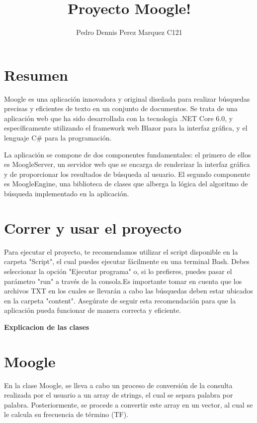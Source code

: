 \documentclass{article}
\begin{document}
\title{\textbf{Proyecto Moogle!}}
\author{Pedro Dennis Perez Marquez C121}
\date{}

\maketitle

\section* {Resumen}
Moogle es una aplicación innovadora y original diseñada para realizar búsquedas precisas y eficientes de texto en un conjunto de documentos. Se trata de una aplicación web que ha sido desarrollada con la tecnología .NET Core 6.0, y específicamente utilizando el framework web Blazor para la interfaz gráfica, y el lenguaje C\#{} para la programación.

La aplicación se compone de dos componentes fundamentales: el primero de ellos es MoogleServer, un servidor web que se encarga de renderizar la interfaz gráfica y de proporcionar los resultados de búsqueda al usuario. El segundo componente es MoogleEngine, una biblioteca de clases que alberga la lógica del algoritmo de búsqueda implementado en la aplicación.



\vspace{10pt}

\section* {Correr y usar el proyecto}
Para ejecutar el proyecto, te recomendamos utilizar el script disponible en la carpeta "Script", el cual puedes ejecutar fácilmente en una terminal Bash. Debes seleccionar la opción "Ejecutar programa" o, si lo prefieres, puedes pasar el parámetro "run" a través de la consola.Es importante tomar en cuenta que los archivos TXT en los cuales se llevarán a cabo las búsquedas deben estar ubicados en la carpeta "content". Asegúrate de seguir esta recomendación para que la aplicación pueda funcionar de manera correcta y eficiente.
\vspace{10pt}
\begin{center}
    \fontsize{16}{20}\selectfont
    \textbf{Explicacion de las clases }
\end{center}
\section* { Moogle}
En la clase Moogle, se lleva a cabo un proceso de conversión de la consulta realizada por el usuario a un array de strings, el cual se separa palabra por palabra. Posteriormente, se procede a convertir este array en un vector, al cual se le calcula su frecuencia de término (TF).
\end{document}
